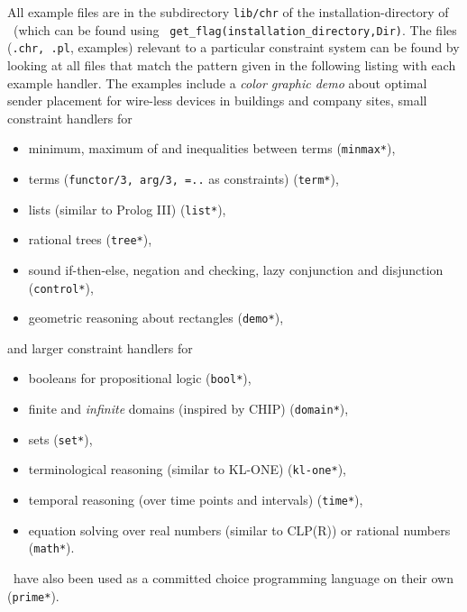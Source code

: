 All example files are in the subdirectory {\tt lib/chr} of the
installation-directory of \eclipse\ (which can be found using {\tt
get\_flag(installation\_directory,Dir)}.  
The files ({\tt .chr, .pl}, examples)
relevant to a
particular constraint system can be found by looking at all files that
match the pattern given in the following listing with each example
handler.  The examples include a {\em color graphic demo} about
optimal sender placement for wire-less devices in buildings and
company sites, small constraint handlers for
\begin{itemize}
\item minimum, maximum of and inequalities between terms ({\tt *minmax*}),
\item terms ({\tt functor/3, arg/3, =..} as constraints) ({\tt *term*}),
\item lists (similar to Prolog III) ({\tt *list*}),
\item rational trees ({\tt *tree*}),
\item sound if-then-else, negation and checking, 
        lazy conjunction and disjunction ({\tt *control*}),
\item geometric reasoning about rectangles ({\tt *demo*}),
\end{itemize}
\noindent and larger constraint handlers for
\begin{itemize}
\item booleans for propositional logic ({\tt *bool*}),
\item finite and {\em infinite} domains (inspired by CHIP) ({\tt *domain*}),
\item sets ({\tt *set*}),
\item terminological reasoning (similar to KL-ONE) \cite{fru93b} ({\tt *kl-one*}),
\item temporal reasoning (over time points and intervals) \cite{fru93} ({\tt *time*}),
\item equation solving over real numbers (similar to CLP(R)) or rational numbers ({\tt *math*}).
\end{itemize}
\chrs\ have also been used as a committed choice programming language
on their own ({\tt *prime*}).

